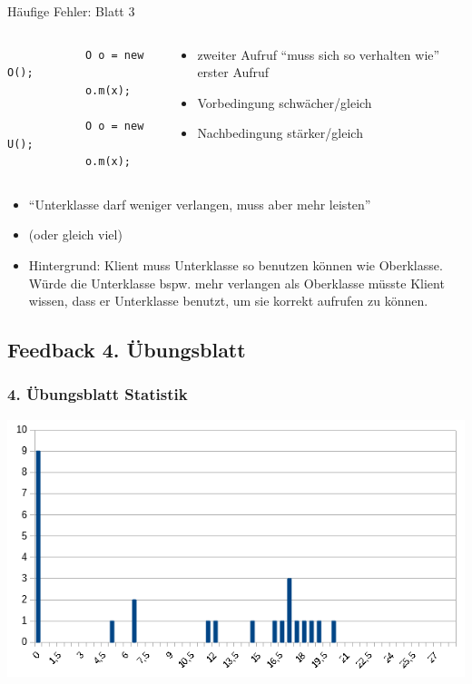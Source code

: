 \documentclass[18pt]{beamer}
\begin{document}
\begin{frame}[fragile]{Häufige Fehler: Blatt 3}
	\begin{columns}
		\begin{column}{0.5\textwidth}
			\begin{verbatim}
			O o = new O();
			o.m(x);
			
			O o = new U(); 
			o.m(x);
			\end{verbatim}
		\end{column}%
		\begin{column}{0.5\textwidth}
			\begin{itemize}
				\item zweiter Aufruf \enquote{muss sich so verhalten wie} erster Aufruf
				\item Vorbedingung schwächer/gleich
				\item Nachbedingung stärker/gleich
			\end{itemize}
		\end{column}
	\end{columns}
	\pause
	\begin{itemize}
		\item \enquote{Unterklasse darf weniger verlangen, muss aber mehr leisten}
		\item (oder gleich viel)
		\item Hintergrund: Klient muss Unterklasse so benutzen können wie Oberklasse. Würde die Unterklasse bspw. mehr verlangen als Oberklasse müsste Klient wissen, dass er Unterklasse benutzt, um sie korrekt aufrufen zu können.
	\end{itemize}
\end{frame}


	\subsection{Feedback 4. Übungsblatt}
	\begin{frame}
		\frametitle{4. Übungsblatt Statistik}
		\includegraphics[scale=0.7]{./pics/tut4/statistics-ub4.png}
	\end{frame}
	
\end{document}
